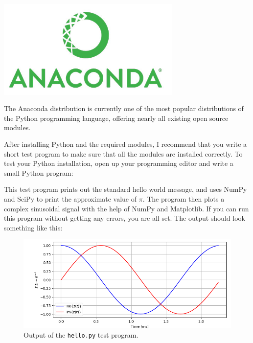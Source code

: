 \begin{marginfigure}[3cm]
  \includegraphics[width=0.68\textwidth]{ch02/figures/analogo.jpg}
  \caption{The Anaconda distribution is currently one of the most
    popular distributions of the Python programming language, offering
    nearly all existing open source modules.}
\end{marginfigure}

After installing Python and the required modules, I recommend that you
write a short test program to make sure that all the modules are
installed correctly. To test your Python installation, open up your
programming editor and write a small Python program:

This test program prints out the standard hello world message, and
uses NumPy and SciPy to print the approximate value of $\pi$. The program then
plots a complex sinusoidal signal with the help of NumPy and
Matplotlib.  If you can run this program without getting any errors,
you are all set. The output should look something like this:

\begin{figure}
  \includegraphics[width=\textwidth]{ch02/figures/testscreen1.png}
  \caption{Output of the \texttt{hello.py} test program.}
\end{figure}

